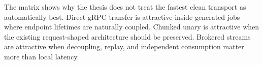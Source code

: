 The matrix shows why the thesis does not treat the fastest clean transport as automatically best. Direct gRPC transfer is attractive inside generated jobs where endpoint lifetimes are naturally coupled. Chunked unary is attractive when the existing request-shaped architecture should be preserved. Brokered streams are attractive when decoupling, replay, and independent consumption matter more than local latency.
